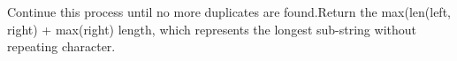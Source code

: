 \documentclass[preview]{standalone}
\begin{document}
Continue this process until no more duplicates are found.Return the max(len(left, right) + max(right) length, which represents the longest sub-string without repeating character.\\
\end{document}
